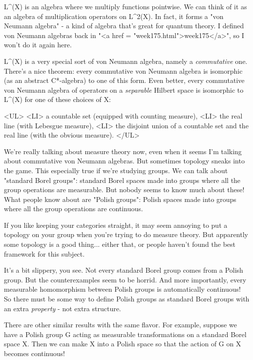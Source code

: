 L^{\infty }(X) is an algebra where we multiply functions
pointwise.  We can think of it as an algebra of multiplication
operators on L^{2}(X).  In fact, it forms a "von Neumann
algebra" - a kind of algebra that's great for quantum theory.  I
defined von Neumann algebras back in "<a href =
"week175.html">week175</a>", so I won't do it again here.

L^{\infty }(X) is a very special sort of von Neumann algebra,
namely a \emph{commutative} one.  There's a nice theorem: every
commutative von Neumann algebra is isomorphic (as an abstract C*-algebra)
to one of this form.
Even better, every commutative von Neumann algebra of operators on a
\emph{separable} Hilbert space is isomorphic 
to L^{\infty }(X) for one of these choices of X:

<UL>
<LI>
a countable set (equipped with counting measure),
<LI>
the real line (with Lebesgue measure),
<LI>
the disjoint union of a countable set and the real line 
(with the obvious measure).
</UL>

We're really talking about measure theory now, even when it seems
I'm talking about commutative von Neumann algebras.  But sometimes
topology sneaks into the game.  This especially true if we're studying 
groups.  We can talk about "standard Borel groups": standard Borel
spaces made into groups where all the group operations are measurable.
But nobody seems to know much about these!  What people know about are
"Polish groups": Polish spaces made into groups where all the group
operations are continuous.  

If you like keeping your categories straight, it may seem annoying to
put a topology on your group when you're trying to do measure theory.
But apparently some topology is a good thing... either that, or people
haven't found the best framework for this subject.

It's a bit slippery, you see.  Not every standard Borel group comes 
from a Polish group.  But the counterexamples seem to be horrid.
And more importantly, every measurable homomorphism between Polish
groups is automatically continuous!  So there must be some way to 
define Polish groups as standard Borel groups with an extra \emph{property} -
not extra structure.

There are other similar results with the same flavor.  For example,
suppose we have a Polish group G acting as measurable transformations 
on a standard Borel space X.  Then we can make X into a Polish space so
that the action of G on X becomes continuous!  

